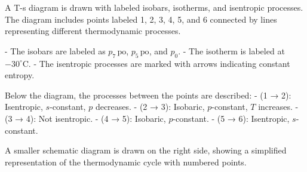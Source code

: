 A T-s diagram is drawn with labeled isobars, isotherms, and isentropic processes. The diagram includes points labeled 1, 2, 3, 4, 5, and 6 connected by lines representing different thermodynamic processes.  

- The isobars are labeled as \( p_7 \, \text{po} \), \( p_5 \, \text{po} \), and \( p_0 \).  
- The isotherm is labeled at \( -30^\circ \text{C} \).  
- The isentropic processes are marked with arrows indicating constant entropy.  

Below the diagram, the processes between the points are described:  
- (1 → 2): Isentropic, \( s \)-constant, \( p \) decreases.  
- (2 → 3): Isobaric, \( p \)-constant, \( T \) increases.  
- (3 → 4): Not isentropic.  
- (4 → 5): Isobaric, \( p \)-constant.  
- (5 → 6): Isentropic, \( s \)-constant.  

A smaller schematic diagram is drawn on the right side, showing a simplified representation of the thermodynamic cycle with numbered points.